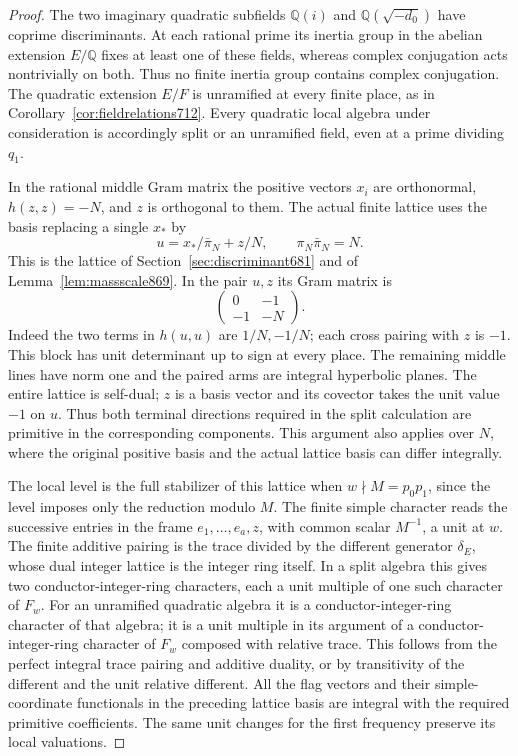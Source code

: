 \documentclass[a4paper,11pt]{article}
\theoremstyle{definition}
\theoremstyle{remark}
\numberwithin{equation}{section}
\begin{document}
\begin{proof}
The two imaginary quadratic subfields \(\mathbb Q(i)\) and
\(\mathbb Q(\sqrt{-d_0})\) have coprime discriminants. At each
rational prime its inertia group in the abelian extension
\(E/\mathbb Q\) fixes at least one of these fields, whereas
complex conjugation acts nontrivially on both.
Thus no finite inertia group contains complex conjugation.
The quadratic extension \(E/F\) is unramified at every finite
place, as in Corollary~\ref{cor:fieldrelations712}. Every
quadratic local algebra under consideration is accordingly split
or an unramified field, even at a prime dividing \(q_1\).

In the rational middle Gram matrix the positive vectors \(x_i\)
are orthonormal, \(h(z,z)=-N\), and \(z\) is orthogonal to them.
The actual finite lattice uses the basis replacing a single
\(x_*\) by
\[
                 u=x_*/\bar\pi_N+z/N,
                         \qquad \pi_N\bar\pi_N=N .
\]
This is the lattice of Section~\ref{sec:discriminant681} and of
Lemma~\ref{lem:massscale869}. In the pair \(u,z\) its Gram
matrix is
\[
                   \begin{pmatrix}0&-1\\-1&-N\end{pmatrix}.
\]
Indeed the two terms in \(h(u,u)\) are \(1/N,-1/N\);
each cross pairing with \(z\) is \(-1\). This block has unit
determinant up to sign at every place. The remaining middle
lines have norm one and the paired arms are integral hyperbolic
planes. The entire lattice is self-dual; \(z\) is a basis
vector and its covector takes the unit value \(-1\) on \(u\).
Thus both terminal directions required in the split calculation
are primitive in the corresponding components. This argument
also applies over \(N\), where the original positive basis and
the actual lattice basis can differ integrally.

The local level is the full stabilizer of this lattice when
\(w\nmid M=p_0p_1\), since the level imposes only the reduction
modulo \(M\). The finite simple character reads the successive
entries in the frame \(e_1,\ldots,e_a,z\), with common scalar
\(M^{-1}\), a unit at \(w\). The finite additive pairing is
the trace divided by the different generator \(\delta_E\), whose
dual integer lattice is the integer ring itself. In a split
algebra this gives two conductor-integer-ring characters, each
a unit multiple of one such character of \(F_w\). For an unramified
quadratic algebra it is a conductor-integer-ring character of
that algebra; it is a unit multiple in its argument of a
conductor-integer-ring character of \(F_w\) composed with
relative trace. This follows from the perfect integral trace
pairing and additive duality, or by transitivity of the different
and the unit relative different. All the flag vectors and their
simple-coordinate functionals in the preceding lattice basis
are integral with the required primitive coefficients.
The same unit changes for the first frequency preserve its
local valuations.


\end{proof}
\end{document}
